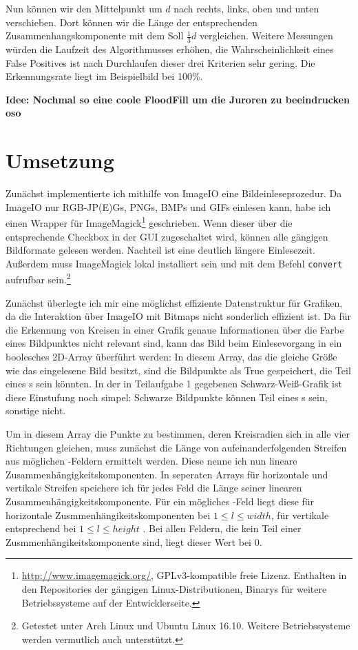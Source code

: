 Nun können wir den Mittelpunkt um  \(d\) nach rechts, links, oben und unten verschieben. Dort können wir die Länge der entsprechenden Zusammenhangskomponente mit dem Soll \(\frac{1}{3}d\) vergleichen. Weitere Messungen würden die Laufzeit des Algorithmusses erhöhen, die Wahrscheinlichkeit eines False Positives ist nach Durchlaufen dieser drei Kriterien sehr gering. Die Erkennungsrate liegt im Beispielbild bei 100\%.

\textbf{Idee: Nochmal so eine coole FloodFill um die Juroren zu beeindrucken oso}
\section{Umsetzung}
Zunächst implementierte ich mithilfe von ImageIO eine Bildeinleseprozedur. Da ImageIO nur RGB-JP(E)Gs, PNGs, BMPs und GIFs einlesen kann, habe ich einen Wrapper für ImageMagick\footnote{\url{http://www.imagemagick.org/}, GPLv3-kompatible freie Lizenz. Enthalten in den Repositories der gängigen Linux-Distributionen, Binarys für weitere Betriebssysteme auf der Entwicklerseite.} geschrieben. Wenn dieser über die entsprechende Checkbox in der GUI zugeschaltet wird, können alle gängigen Bildformate gelesen werden. Nachteil ist eine deutlich längere Einlesezeit. Außerdem muss ImageMagick lokal installiert sein und mit dem Befehl \texttt{convert} aufrufbar sein.\footnote{Getestet unter Arch Linux und Ubuntu Linux 16.10. Weitere Betriebssysteme werden vermutlich auch unterstützt.}

Zunächst überlegte ich mir eine möglichst effiziente Datenstruktur für Grafiken, da die Interaktion über ImageIO mit Bitmaps nicht sonderlich effizient ist. Da für die Erkennung von Kreisen in einer Grafik genaue Informationen über die Farbe eines Bildpunktes nicht relevant sind, kann das Bild beim Einlesevorgang in ein boolesches 2D-Array überführt werden: In diesem Array, das die gleiche Größe wie das eingelesene Bild besitzt, sind die Bildpunkte als True gespeichert, die Teil eines \task{}s sein könnten. In der in Teilaufgabe 1 gegebenen Schwarz-Weiß-Grafik ist diese Einstufung noch simpel: Schwarze Bildpunkte können Teil eines \task{}s sein, sonstige nicht.

Um in diesem Array die Punkte zu bestimmen, deren Kreisradien sich in alle vier Richtungen gleichen, muss zunächst die Länge von aufeinanderfolgenden Streifen aus möglichen \task{}-Feldern ermittelt werden. Diese nenne ich nun lineare Zusammenhängigkeitskomponenten. In seperaten Arrays für horizontale und vertikale Streifen speichere ich für jedes Feld die Länge seiner linearen Zusammenhängigkeitskomponente. Für ein mögliches \task{}-Feld liegt diese für horizontale Zusmmenhängikeitskomponenten bei \(1 \le l \le width\), für vertikale entsprechend bei
\(1 \le l \le height\)
. Bei allen Feldern, die kein Teil einer Zusmmenhängikeitskomponente sind, liegt dieser Wert bei 0. 

